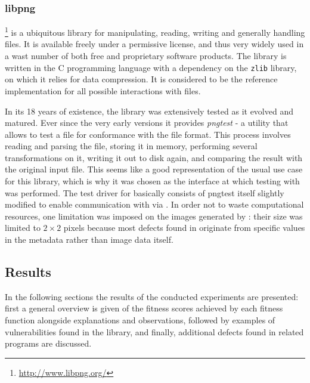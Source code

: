 \tocless\subsubsection{libpng}
\libpng\footnote{\url{http://www.libpng.org/}} is a ubiquitous library for manipulating, reading,
writing and generally handling \png files. It is available freely under a permissive license, and thus very
widely used in a wast number of both free and proprietary software products. The \libpng library is
written in the {\small C} programming language with a dependency on the \texttt{zlib} library, on which it
relies for data compression. It is considered to be the reference implementation for all possible interactions
with \png files.

In its 18 years of existence, the library was extensively tested as it evolved and matured. Ever since the very
early versions it provides \emph{pngtest} - a utility that allows to test a \png file for conformance with the
\png file format. This process involves reading and parsing the file, storing it in memory, performing several
transformations on it, writing it out to disk again, and comparing the result with the original input file.
This seems like a good representation of the usual use case for this library, which is why it was chosen as
the interface at which testing with \xmlmate was performed. The test driver for \libpng basically
consists of pngtest itself slightly modified to enable communication with \xmlmate via \zmq. In order not
to waste computational resources, one limitation was imposed on the images generated by \xmlmate: their size
was limited to $2\times 2$ pixels because most defects found in \libpng originate from specific values
in the metadata rather than image data itself.

\subsection{Results}
In the following sections the results of the conducted experiments are presented: first a general overview is
given of the fitness scores achieved by each fitness function alongside explanations and observations,
followed by examples of vulnerabilities found in the \libpng library, and finally, additional defects found in
related programs are discussed.

